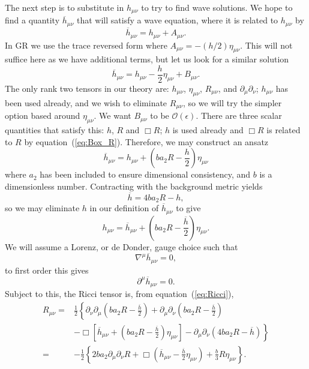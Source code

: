 \documentclass[a4paper, 11pt, titlepage, twoside]{report}
\newcommand{\eqnref}[1]{equation~(\ref{eq:#1})}
\newcommand{\order}[1]{\ensuremath{\mathcal{O}({#1})}}
\begin{document}
The next step is to substitute in $h_{\mu\nu}$ to try to find wave solutions. We hope to find a quantity $\overline{h}_{\mu\nu}$ that will satisfy a wave equation, where it is related to $h_{\mu\nu}$ by
\begin{equation}
\overline{h}_{\mu\nu} = h_{\mu\nu} + A_{\mu\nu}.
\end{equation}
In GR we use the trace reversed form where $A_{\mu\nu} = -(h/2)\eta_{\mu\nu}$. This will not suffice here as we have additional terms, but let us look for a similar solution
\begin{equation}
\overline{h}_{\mu\nu} = h_{\mu\nu} - \frac{h}{2}\eta_{\mu\nu} + B_{\mu\nu}.
\end{equation}
The only rank two tensors in our theory are: $h_{\mu\nu}$, $\eta_{\mu\nu}$, $R_{\mu\nu}$, and $\partial_\mu\partial_\nu$; $h_{\mu\nu}$ has been used already, and we wish to eliminate $R_{\mu\nu}$, so we will try the simpler option based around $\eta_{\mu\nu}$. We want $B_{\mu\nu}$ to be $\order{\epsilon}$. There are three scalar quantities that satisfy this: $h$, $R$ and $\Box R$; $h$ is used already and $\Box R$ is related to $R$ by \eqnref{Box_R}. Therefore, we may construct an ansatz
\begin{equation}
\overline{h}_{\mu\nu} = h_{\mu\nu} + \left(b a_2 R - \frac{h}{2}\right)\eta_{\mu\nu}
\label{eq:Ansatz}
\end{equation}
where $a_2$ has been included to ensure dimensional consistency, and $b$ is a dimensionless number. Contracting with the background metric yields
\begin{equation}
\overline{h} = 4b a_2 R - h,
\label{eq:h_trace}
\end{equation}
so we may eliminate $h$ in our definition of $\overline{h}_{\mu\nu}$ to give
\begin{equation}
h_{\mu\nu} = \overline{h}_{\mu\nu} + \left(b a_2 R -\frac{\overline{h}}{2}\right)\eta_{\mu\nu}.
\end{equation}
We will assume a Lorenz, or de Donder, gauge choice such that
\begin{equation}
\nabla^\mu \overline{h}_{\mu\nu} = 0,
\label{eq:Lorenz}
\end{equation}
to first order this gives
\begin{equation}
\partial^\mu \overline{h}_{\mu\nu} = 0.
\end{equation}
Subject to this, the Ricci tensor is, from \eqnref{Ricci},
\begin{align}
R_{\mu\nu} = {} & \frac{1}{2}\left\{\partial_\nu\partial_\mu \left(b a_2 R -\frac{\overline{h}}{2}\right) + \partial_\mu\partial_\nu \left(b a_2 R -\frac{\overline{h}}{2}\right) \right. \nonumber \\
 & \left. - \Box \left[\overline{h}_{\mu\nu} + \left(b a_2 R -\frac{\overline{h}}{2}\right)\eta_{\mu\nu}\right] - \partial_\mu\partial_\nu (4b a_2 R - \overline{h})\right\} \nonumber \\
 = {} & -\frac{1}{2}\left\{2b a_2 \partial_\mu\partial_\nu R + \Box\left(\overline{h}_{\mu\nu} -\frac{\overline{h}}{2}\eta_{\mu\nu}\right) + \frac{b}{3}R\eta_{\mu\nu}\right\}.
\end{align}
\end{document}
